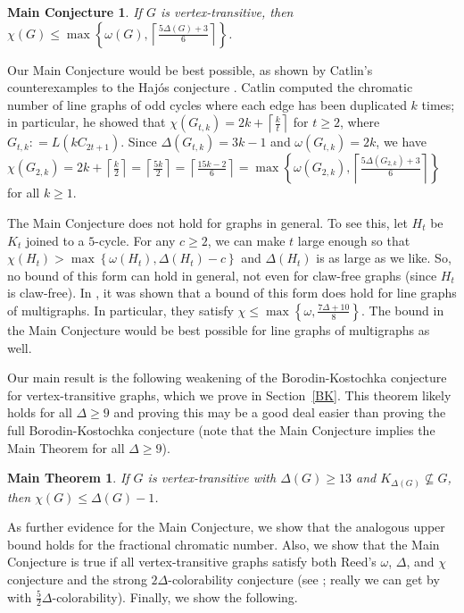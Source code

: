 \documentclass[12pt]{article}
\theoremstyle{plain}
\newtheorem*{mainconj}{Main Conjecture}
\newtheorem*{mainthm}{Main Theorem}
\theoremstyle{definition}
\theoremstyle{remark}
\newcommand{\set}[1]{\left\{ #1 \right\}}
\newcommand{\ceil}[1]{\left\lceil#1\right\rceil}
\newcommand{\DefinedAs}{\mathrel{\mathop:}=}
\begin{document}
\begin{mainconj}
If $G$ is vertex-transitive, then $\chi(G) \le \max \set{\omega(G), \ceil{\frac{5\Delta(G) + 3}{6}}}$.
\end{mainconj}

Our Main Conjecture would be best possible, as shown by Catlin's
counterexamples to the Haj{\'o}s conjecture \cite{catlin1979hajos}.  Catlin
computed the chromatic number of line graphs of odd cycles where each edge has
been duplicated $k$ times; in particular, he showed that $\chi(G_{t,k}) = 2k +
\ceil{\frac{k}{t}}$ for $t \ge 2$, where $G_{t,k} \DefinedAs L(kC_{2t+1})$.
Since $\Delta(G_{t,k}) = 3k-1$ and $\omega(G_{t,k}) = 2k$, we have
$\chi(G_{2, k}) = 2k+\ceil{\frac{k}2}=\ceil{\frac{5k}2} = 
\ceil{\frac{15k-2}6} =
\max \set{\omega(G_{2,k}), \ceil{\frac{5\Delta(G_{2,k}) + 3}{6}}}$ for
all $k \ge 1$.

The Main Conjecture does not hold for graphs in general.  To see this, let $H_t$ be $K_t$ joined to a $5$-cycle. 
For any $c \ge 2$, we can make $t$ large enough so that $\chi(H_t) > \max\set{\omega(H_t), \Delta(H_t) - c}$ and $\Delta(H_t)$ is as large as we like.  
So, no bound of this form can hold in general, not even for claw-free graphs (since $H_t$ is claw-free). In \cite{rabern2011strengthening}, it was shown that a bound of this form does hold for line graphs of multigraphs.  In particular, they satisfy $\chi \le \max \set{\omega, \frac{7\Delta + 10}{8}}$.  The bound in the Main Conjecture would be best possible for line graphs of multigraphs as well.

Our main result is the following weakening of the Borodin-Kostochka conjecture
for vertex-transitive graphs, which we prove in Section~\ref{BK}.  This theorem
likely holds for all $\Delta \ge 9$ and proving this may be a good deal easier
than proving the full Borodin-Kostochka conjecture (note that the Main
Conjecture implies the Main Theorem for all $\Delta \ge 9$).

\begin{mainthm}\label{BKTransitive}
If $G$ is vertex-transitive with $\Delta(G) \ge 13$ and $K_{\Delta(G)} \not \subseteq G$, then $\chi(G) \le \Delta(G) - 1$.
\end{mainthm}

As further evidence for the Main Conjecture, we show that the analogous upper
bound holds for the fractional chromatic number.  Also, we show that the Main
Conjecture is true if all vertex-transitive graphs satisfy both Reed's
$\omega$, $\Delta$, and $\chi$ conjecture and the strong $2\Delta$-colorability
conjecture (see \cite{aharoni2007independent}; really we can get by with
$\frac52\Delta$-colorability).  Finally, we show the following.
\end{document}
